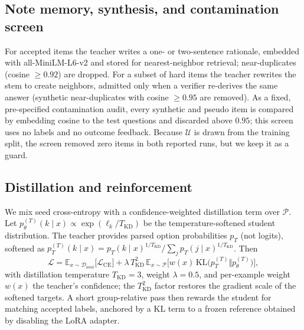 \documentclass[conference]{IEEEtran}
\begin{document}
\subsection{Note memory, synthesis, and contamination screen}
For accepted items the teacher writes a one- or two-sentence rationale, embedded with all-MiniLM-L6-v2 and stored for nearest-neighbor retrieval; near-duplicates (cosine $\ge 0.92$) are dropped. For a subset of hard items the teacher rewrites the stem to create neighbors, admitted only when a verifier re-derives the same answer (synthetic near-duplicates with cosine $\ge 0.95$ are removed). As a fixed, pre-specified contamination audit, every synthetic and pseudo item is compared by embedding cosine to the test questions and discarded above $0.95$; this screen uses no labels and no outcome feedback. Because $\mathcal{U}$ is drawn from the training split, the screen removed zero items in both reported runs, but we keep it as a guard.

\subsection{Distillation and reinforcement}
We mix seed cross-entropy with a confidence-weighted distillation term over $\mathcal{P}$. Let $p_\theta^{(T)}(k\mid x)\propto\exp(\ell_k/T_{\text{KD}})$ be the temperature-softened student distribution. The teacher provides parsed option probabilities $p_T$ (not logits), softened as $p_T^{(T)}(k\mid x)=p_T(k\mid x)^{1/T_{\text{KD}}}\big/\sum_j p_T(j\mid x)^{1/T_{\text{KD}}}$. Then
\begin{equation}
\mathcal{L}=\mathbb{E}_{x\sim\mathcal{D}_{\text{seed}}}\!\big[\mathcal{L}_{\text{CE}}\big]
+\lambda\,T_{\text{KD}}^{2}\,\mathbb{E}_{x\sim\mathcal{P}}\!\big[w(x)\,\mathrm{KL}\!\big(p_T^{(T)}\Vert p_\theta^{(T)}\big)\big],
\end{equation}
with distillation temperature $T_{\text{KD}}=3$, weight $\lambda=0.5$, and per-example weight $w(x)$ the teacher's confidence; the $T_{\text{KD}}^2$ factor restores the gradient scale of the softened targets. A short group-relative pass \cite{grpo} then rewards the student for matching accepted labels, anchored by a KL term to a frozen reference obtained by disabling the LoRA adapter.
\end{document}
